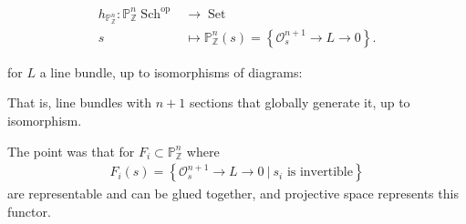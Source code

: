 \begin{align*} h_{{\mathbb{P}}^n_{\mathbb{Z}}}: {\mathbb{P}}_{\mathbb{Z}}^n {\operatorname{Sch}}^\operatorname{op}&\to {\operatorname{Set}}\\ s &\mapsto {\mathbb{P}}^n_{\mathbb{Z}}(s) = \left\{{ {\mathcal{O}}_s^{n+1} \to L \to 0}\right\} .\end{align*}

for \(L\) a line bundle, up to isomorphisms of diagrams:

\begin{center}
\end{center}

That is, line bundles with \(n+1\) sections that globally generate it,
up to isomorphism.

The point was that for \(F_i \subset {\mathbb{P}}_{\mathbb{Z}}^n\) where
\begin{align*}
F_i(s) = \left\{{{\mathcal{O}}_s^{n+1} \to L \to 0 {~\mathrel{\Big|}~}s_i \text{ is invertible}}\right\}
\end{align*}
are representable and can be glued together, and projective space
represents this functor.


